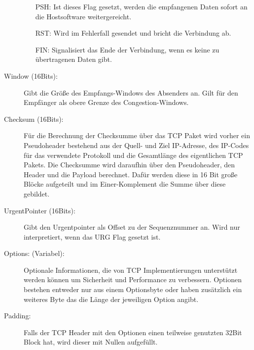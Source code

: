 \begin{description}
\begin{itemize}
\item[PSH: ] Ist dieses Flag gesetzt, werden die empfangenen Daten sofort an die Hostsoftware weitergereicht. 
\item[RST: ] Wird im Fehlerfall gesendet und bricht die Verbindung ab. 
\item[FIN: ] Signalisiert das Ende der Verbindung, wenn es keine zu übertragenen Daten gibt. 
\end{itemize}
\item[Window (16Bits): ] Gibt die Größe des Empfangs-Windows des Absenders an. Gilt für den Empfänger als obere Grenze des Congestion-Windows.
\item[Checksum (16Bits): ] Für die Berechnung der Checksumme über das TCP Paket wird vorher ein Pseudoheader bestehend aus der Quell- und Ziel IP-Adresse, des IP-Codes für das verwendete Protokoll und die Gesamtlänge des eigentlichen TCP Pakets. Die Checksumme wird daraufhin über den Pseudoheader, den Header und die Payload berechnet. Dafür werden diese in 16 Bit große Blöcke aufgeteilt und im Einer-Komplement die Summe über diese gebildet. 
\item[UrgentPointer (16Bits): ] Gibt den Urgentpointer als Offset zu der Sequenznummer an. Wird nur interpretiert, wenn das URG Flag gesetzt ist.\
\item[Options: (Variabel): ]  Optionale Informationen, die von TCP Implementierungen unterstützt werden können um Sicherheit und Performance zu verbessern. Optionen bestehen entweder nur aus einem Optionsbyte oder haben zusätzlich ein weiteres Byte das die Länge der jeweiligen Option angibt. 
\item[Padding: ] Falls der TCP Header mit den Optionen einen teilweise genutzten 32Bit Block hat, wird dieser mit Nullen aufgefüllt. 
\end{description}
